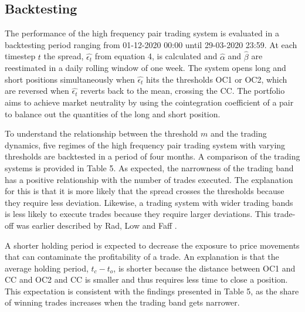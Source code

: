 \documentclass[12pt,english,authoryear]{article}
\begin{document}
\subsection{Backtesting}

The performance of the high frequency pair trading system is evaluated in a backtesting period ranging from 01-12-2020 00:00 until 29-03-2020 23:59. At each timestep $t$ the spread, $\hat{\epsilon_t}$ from equation 4, is calculated and $\hat{\alpha}$ and $\hat{\beta}$ are reestimated in a daily rolling window of one week. The system opens long and short positions simultaneously when $\hat{\epsilon_t}$ hits the thresholds OC1 or OC2, which are reversed when $\hat{\epsilon_t}$ reverts back to the mean, crossing the CC. The portfolio aims to achieve market neutrality by using the cointegration coefficient of a pair to balance out the quantities of the long and short position.

To understand the relationship between the threshold $m$ and the trading dynamics, five regimes of the high frequency pair trading system with varying thresholds are backtested in a period of four months. A comparison of the trading systems is provided in Table 5. As expected, the narrowness of the trading band has a positive relationship with the number of trades executed. The explanation for this is that it is more likely that the spread crosses the thresholds because they require less deviation. Likewise, a trading system with wider trading bands is less likely to execute trades because they require larger deviations. This trade-off was earlier described by Rad, Low and Faff \citeyear{Rad_2015}. 

A shorter holding period is expected to decrease the exposure to price movements that can contaminate the profitability of a trade. An explanation is that the average holding period, $t_c - t_o$, is shorter because the distance between OC1 and CC and OC2 and CC is smaller and thus requires less time to close a position. This expectation is consistent with the findings presented in Table 5, as the share of winning trades increases when the trading band gets narrower.
\end{document}
